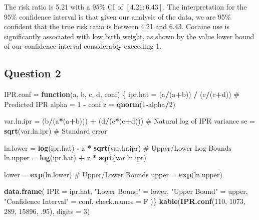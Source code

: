 \documentclass[
]{article}
\newenvironment{Shaded}{\begin{snugshade}}{\end{snugshade}}
\newcommand{\AttributeTok}[1]{\textcolor[rgb]{0.13,0.29,0.53}{#1}}
\newcommand{\CommentTok}[1]{\textcolor[rgb]{0.56,0.35,0.01}{\textit{#1}}}
\newcommand{\ControlFlowTok}[1]{\textcolor[rgb]{0.13,0.29,0.53}{\textbf{#1}}}
\newcommand{\DecValTok}[1]{\textcolor[rgb]{0.00,0.00,0.81}{#1}}
\newcommand{\FunctionTok}[1]{\textcolor[rgb]{0.13,0.29,0.53}{\textbf{#1}}}
\newcommand{\NormalTok}[1]{#1}
\newcommand{\OtherTok}[1]{\textcolor[rgb]{0.56,0.35,0.01}{#1}}
\newcommand{\SpecialCharTok}[1]{\textcolor[rgb]{0.81,0.36,0.00}{\textbf{#1}}}
\newcommand{\StringTok}[1]{\textcolor[rgb]{0.31,0.60,0.02}{#1}}
\renewcommand{\CommentTok}[1]{\textcolor[rgb]{0.60,0.20,0.20}{#1}}
\begin{document}
The risk ratio is 5.21 with a 95\% CI of \([4.21 : 6.43]\). The
interpretation for the 95\% confidence interval is that given our
analysis of the data, we are 95\% confident that the true risk ratio is
between 4.21 and 6.43. Cocaine use is significantly associated with low
birth weight, as shown by the value lower bound of our confidence
interval considerably exceeding 1.

\subsection{Question 2}\label{question-2}

\begin{Shaded}
\begin{Highlighting}[]
\NormalTok{IPR.conf }\OtherTok{=} \ControlFlowTok{function}\NormalTok{(a, b, c, d, conf) \{}
\NormalTok{  ipr.hat }\OtherTok{=}\NormalTok{ (a}\SpecialCharTok{/}\NormalTok{(a}\SpecialCharTok{+}\NormalTok{b)) }\SpecialCharTok{/}\NormalTok{ (c}\SpecialCharTok{/}\NormalTok{(c}\SpecialCharTok{+}\NormalTok{d))                 }\CommentTok{\# Predicted IPR}
\NormalTok{  alpha }\OtherTok{=} \DecValTok{1} \SpecialCharTok{{-}}\NormalTok{ conf}
\NormalTok{  z }\OtherTok{=} \FunctionTok{qnorm}\NormalTok{(}\DecValTok{1}\SpecialCharTok{{-}}\NormalTok{alpha}\SpecialCharTok{/}\DecValTok{2}\NormalTok{)}
  
\NormalTok{  var.ln.ipr }\OtherTok{=}\NormalTok{ (b}\SpecialCharTok{/}\NormalTok{(a}\SpecialCharTok{*}\NormalTok{(a}\SpecialCharTok{+}\NormalTok{b))) }\SpecialCharTok{+}\NormalTok{ (d}\SpecialCharTok{/}\NormalTok{(c}\SpecialCharTok{*}\NormalTok{(c}\SpecialCharTok{+}\NormalTok{d)))      }\CommentTok{\# Natural log of IPR variance}
\NormalTok{  se }\OtherTok{=} \FunctionTok{sqrt}\NormalTok{(var.ln.ipr)                           }\CommentTok{\# Standard error}
  
\NormalTok{  ln.lower }\OtherTok{=} \FunctionTok{log}\NormalTok{(ipr.hat) }\SpecialCharTok{{-}}\NormalTok{ z }\SpecialCharTok{*} \FunctionTok{sqrt}\NormalTok{(var.ln.ipr)  }\CommentTok{\# Upper/Lower Log Bounds}
\NormalTok{  ln.upper }\OtherTok{=} \FunctionTok{log}\NormalTok{(ipr.hat) }\SpecialCharTok{+}\NormalTok{ z }\SpecialCharTok{*} \FunctionTok{sqrt}\NormalTok{(var.ln.ipr)}
  
\NormalTok{  lower }\OtherTok{=} \FunctionTok{exp}\NormalTok{(ln.lower)                           }\CommentTok{\# Upper/Lower Bounds}
\NormalTok{  upper }\OtherTok{=} \FunctionTok{exp}\NormalTok{(ln.upper)}
  
  \FunctionTok{data.frame}\NormalTok{(}
    \AttributeTok{IPR =}\NormalTok{ ipr.hat,}
    \StringTok{"Lower Bound"} \OtherTok{=}\NormalTok{ lower,}
    \StringTok{"Upper Bound"} \OtherTok{=}\NormalTok{ upper,}
    \StringTok{"Confidence Interval"} \OtherTok{=}\NormalTok{ conf,}
    \AttributeTok{check.names =}\NormalTok{ F}
\NormalTok{  )\}}
\FunctionTok{kable}\NormalTok{(}\FunctionTok{IPR.conf}\NormalTok{(}\DecValTok{110}\NormalTok{, }\DecValTok{1073}\NormalTok{, }\DecValTok{289}\NormalTok{, }\DecValTok{15896}\NormalTok{, .}\DecValTok{95}\NormalTok{), }\AttributeTok{digits =} \DecValTok{3}\NormalTok{)}
\end{Highlighting}
\end{Shaded}
\end{document}
